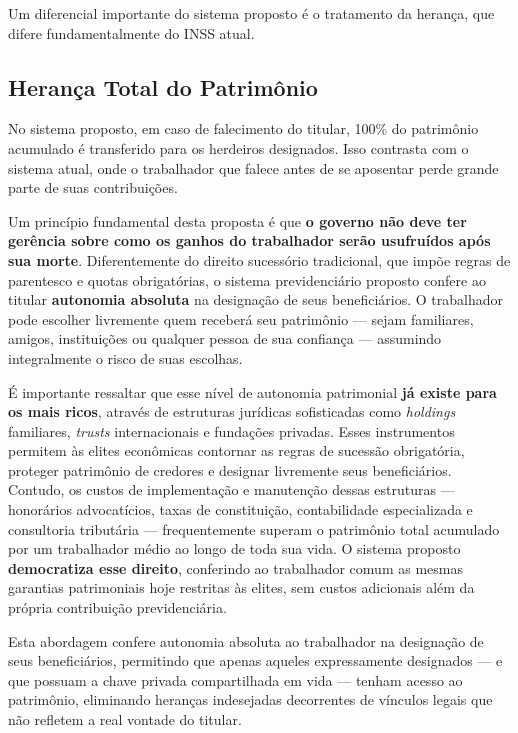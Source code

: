 Um diferencial importante do sistema proposto é o tratamento da herança, que difere fundamentalmente do INSS atual.

\subsection{Herança Total do Patrimônio}

No sistema proposto, em caso de falecimento do titular, 100\% do patrimônio acumulado é transferido para os herdeiros designados. Isso contrasta com o sistema atual, onde o trabalhador que falece antes de se aposentar perde grande parte de suas contribuições.

Um princípio fundamental desta proposta é que \textbf{o governo não deve ter gerência sobre como os ganhos do trabalhador serão usufruídos após sua morte}. Diferentemente do direito sucessório tradicional, que impõe regras de parentesco e quotas obrigatórias, o sistema previdenciário proposto confere ao titular \textbf{autonomia absoluta} na designação de seus beneficiários. O trabalhador pode escolher livremente quem receberá seu patrimônio --- sejam familiares, amigos, instituições ou qualquer pessoa de sua confiança --- assumindo integralmente o risco de suas escolhas.

É importante ressaltar que esse nível de autonomia patrimonial \textbf{já existe para os mais ricos}, através de estruturas jurídicas sofisticadas como \textit{holdings} familiares, \textit{trusts} internacionais e fundações privadas. Esses instrumentos permitem às elites econômicas contornar as regras de sucessão obrigatória, proteger patrimônio de credores e designar livremente seus beneficiários. Contudo, os custos de implementação e manutenção dessas estruturas --- honorários advocatícios, taxas de constituição, contabilidade especializada e consultoria tributária --- frequentemente superam o patrimônio total acumulado por um trabalhador médio ao longo de toda sua vida. O sistema proposto \textbf{democratiza esse direito}, conferindo ao trabalhador comum as mesmas garantias patrimoniais hoje restritas às elites, sem custos adicionais além da própria contribuição previdenciária.

Esta abordagem confere autonomia absoluta ao trabalhador na designação de seus beneficiários, permitindo que apenas aqueles expressamente designados --- e que possuam a chave privada compartilhada em vida --- tenham acesso ao patrimônio, eliminando heranças indesejadas decorrentes de vínculos legais que não refletem a real vontade do titular.

